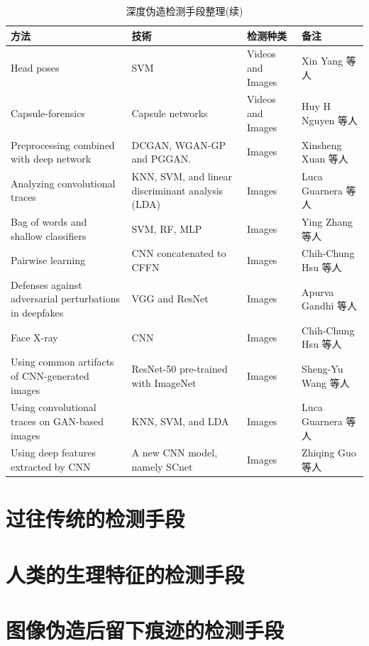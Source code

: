 \begin{table}[ht]
  \caption{深度伪造检测手段整理(续)}
  \label{Tab:bookRWCal}
  \centering
  \begin{tabular}{p{3cm}p{3cm}p{3cm}p{3cm}}
  \toprule
  \textbf{方法} &\textbf{技術} &\textbf{检测种类}&\textbf{备注}\\
  \midrule
 Head poses & SVM & Videos and Images & Xin Yang 等人\\
 Capsule-forensics & Capsule networks & Videos and Images & Huy H Nguyen 等人\\
 Preprocessing combined with deep network & DCGAN, WGAN-GP and PGGAN. & Images & Xinsheng Xuan 等人\\
 Analyzing convolutional traces & KNN, SVM, and linear discriminant analysis (LDA) & Images &  Luca Guarnera 等人\\
 Bag of words and shallow classifiers & SVM, RF, MLP & Images & Ying Zhang 等人\\
 Pairwise learning & CNN concatenated to CFFN & Images & Chih-Chung Hsu 等人\\
 Defenses against adversarial perturbations in deepfakes & VGG and ResNet & Images &  Apurva Gandhi 等人\\
 Face X-ray & CNN & Images & Chih-Chung Hsu 等人\\
 Using common artifacts of CNN-generated images & ResNet-50 pre-trained with ImageNet & Images & Sheng-Yu Wang 等人\\
 Using convolutional traces on GAN-based images & KNN, SVM, and LDA & Images & Luca Guarnera 等人\\
 Using deep features extracted by CNN & A new CNN model, namely SCnet & Images & Zhiqing Guo 等人\\
  \bottomrule
  \end{tabular}
\end{table}

\section{过往传统的检测手段}


\section{人类的生理特征的检测手段}


\section{图像伪造后留下痕迹的检测手段}


